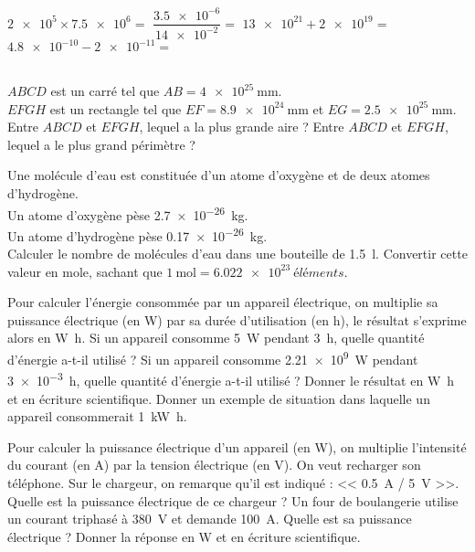 \documentclass[../Cours.tex]{subfiles}
\begin{document}
\begin{questions}
    \vspace{-1.5em}
        \begin{multicols}{2}
            \question $\num{2e5} \times \num{7.5e6} = $
            \question $\dfrac{\num{3.5e-6}}{\num{14e-2}} = $
            \question $\num{13e21} + \num{2e19} = $
            \question $\num{4.8e-10} - \num{2e-11} = $
        \end{multicols}

    \exercice\\
        $ABCD$ est un carré tel que $AB = \qty{4e25}{\milli\metre}$.\\
        $EFGH$ est un rectangle tel que $EF = \qty{8,9e24}{\milli\metre}$ et $EG = \qty{2,5e25}{\milli\metre}$.
        \question Entre $ABCD$ et $EFGH$, lequel a la plus grande aire ?
        \question Entre $ABCD$ et $EFGH$, lequel a le plus grand périmètre ?

        Une molécule d'eau est constituée d'un atome d'oxygène et de deux atomes d'hydrogène.\\
        Un atome d'oxygène pèse \qty{2.7e-26}{kg}.\\
        Un atome d'hydrogène pèse \qty{0.17e-26}{kg}.\\
        \question Calculer le nombre de molécules d'eau dans une bouteille de \qty{1.5}{\litre}.
        \question Convertir cette valeur en mole, sachant que $\qty{1}{\mol} = \qty{6.022e23}{éléments}$. 

    \clearpage
    \vspace{-1em}
        \question Pour calculer l'énergie consommée par un appareil électrique, on multiplie sa puissance électrique (en \unit{\watt}) par sa durée d'utilisation (en \unit{\hour}), le résultat s'exprime alors en \unit{\watt\hour}.
            \subquestion Si un appareil consomme \qty{5}{\watt} pendant \qty{3}{\hour}, quelle quantité d'énergie a-t-il utilisé ?
            \subquestion Si un appareil consomme \qty{2.21e9}{\watt} pendant \qty{3e-3}{\hour}, quelle quantité d'énergie a-t-il utilisé ? Donner le résultat en \unit{\watt\hour} et en écriture scientifique.
            \subquestion Donner un exemple de situation dans laquelle un appareil consommerait \qty{1}{\kilo\watt\hour}.

        \vspace{1em}
        \question Pour calculer la puissance électrique d'un appareil (en \unit{\watt}), on multiplie l'intensité du courant (en \unit{\ampere}) par la tension électrique (en \unit{\volt}).
            \subquestion On veut recharger son téléphone. Sur le chargeur, on remarque qu'il est indiqué : << \qty{0.5}{\ampere} / \qty{5}{\volt} >>. Quelle est la puissance électrique de ce chargeur ?
            \subquestion Un four de boulangerie utilise un courant triphasé à \qty{380}{\volt} et demande \qty{100}{\ampere}. Quelle est sa puissance électrique ? Donner la réponse en \unit{\watt} et en écriture scientifique.


\end{questions}
\end{document}
